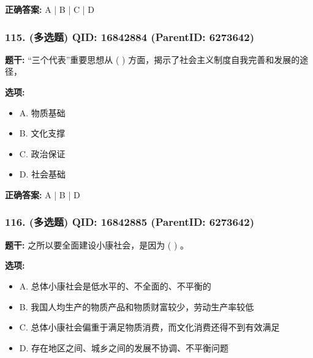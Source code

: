 \documentclass[12pt,UTF8]{ctexart}
\begin{document}
\textbf{正确答案:}
A | B | C | D

\vspace{0.3em}\hrulefill\vspace{0.7em}

\subsubsection*{115. (多选题) \small QID: 16842884 (ParentID: 6273642)}

\textbf{题干:}
“三个代表”重要思想从 ( ) 方面，揭示了社会主义制度自我完善和发展的途径，



\textbf{选项:}
\begin{itemize}[leftmargin=*]

  \item A. 物质基础

  \item B. 文化支撑

  \item C. 政治保证

  \item D. 社会基础

\end{itemize}

\textbf{正确答案:}
A | B | D

\vspace{0.3em}\hrulefill\vspace{0.7em}

\subsubsection*{116. (多选题) \small QID: 16842885 (ParentID: 6273642)}

\textbf{题干:}
之所以要全面建设小康社会，是因为 ( ) 。



\textbf{选项:}
\begin{itemize}[leftmargin=*]

  \item A. 总体小康社会是低水平的、不全面的、不平衡的

  \item B. 我国人均生产的物质产品和物质财富较少，劳动生产率较低

  \item C. 总体小康社会偏重于满足物质消费，而文化消费还得不到有效满足

  \item D. 存在地区之间、城乡之间的发展不协调、不平衡问题

\end{itemize}
\end{document}
